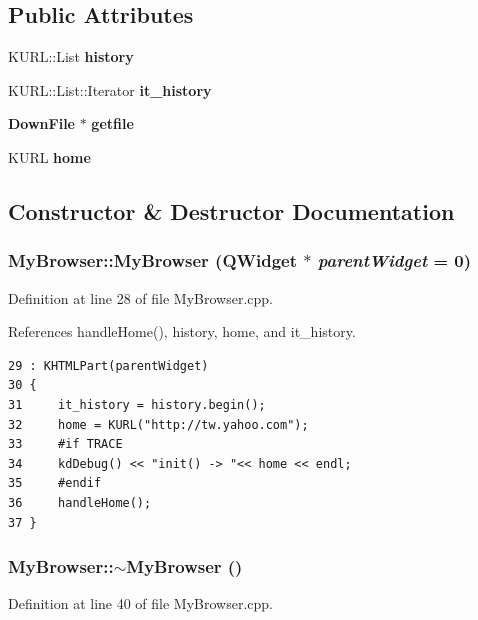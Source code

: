 \subsection*{Public Attributes}
\begin{CompactItemize}
\item 
KURL::List {\bf history}
\item 
KURL::List::Iterator {\bf it\_\-history}
\item 
{\bf Down\-File} $\ast$ {\bf getfile}
\item 
KURL {\bf home}
\end{CompactItemize}


\subsection{Constructor \& Destructor Documentation}
\subsubsection{\setlength{\rightskip}{0pt plus 5cm}My\-Browser::My\-Browser ({\bf QWidget} $\ast$ {\em parent\-Widget} = 0)}\label{classMyBrowser_MyBrowsera0}




Definition at line 28 of file My\-Browser.cpp.

References handle\-Home(), history, home, and it\_\-history.



\footnotesize\begin{verbatim}29 : KHTMLPart(parentWidget)
30 {
31     it_history = history.begin();
32     home = KURL("http://tw.yahoo.com");
33     #if TRACE 
34     kdDebug() << "init() -> "<< home << endl;    
35     #endif
36     handleHome();      
37 }
\end{verbatim}\normalsize 
{}
\subsubsection{\setlength{\rightskip}{0pt plus 5cm}My\-Browser::$\sim${\bf My\-Browser} ()}\label{classMyBrowser_MyBrowsera1}




Definition at line 40 of file My\-Browser.cpp.



